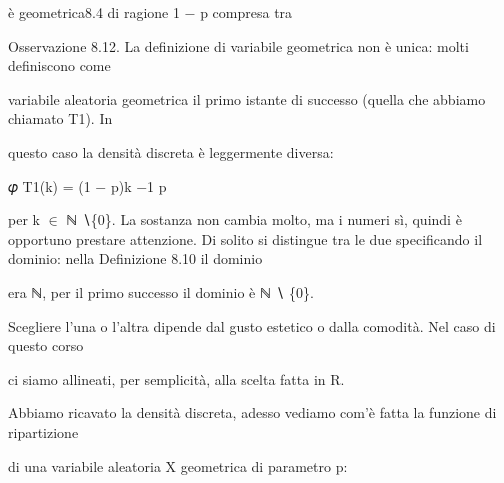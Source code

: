 \documentclass[a4paper,portrait,12pt]{article}
\begin{document}
\begin{flushleft}
\`{e} geometrica8.4 di ragione 1 $-$ p compresa tra
\end{flushleft}





\begin{flushleft}
Osservazione 8.12. La definizione di variabile geometrica non \`{e} unica: molti definiscono come
\end{flushleft}


\begin{flushleft}
variabile aleatoria geometrica il primo istante di successo (quella che abbiamo chiamato T1). In
\end{flushleft}


\begin{flushleft}
questo caso la densit\`{a} discreta \`{e} leggermente diversa:
\end{flushleft}


\begin{flushleft}
𝜑 T1(k) = (1 $-$ p)k $-$1 p
\end{flushleft}


\begin{flushleft}
per k $\in$ ℕ ∖\{0\}. La sostanza non cambia molto, ma i numeri sì, quindi \`{e} opportuno prestare attenzione. Di solito si distingue tra le due specificando il dominio: nella Definizione 8.10 il dominio
\end{flushleft}


\begin{flushleft}
era ℕ, per il primo successo il dominio \`{e} ℕ ∖ \{0\}.
\end{flushleft}


\begin{flushleft}
Scegliere l'una o l'altra dipende dal gusto estetico o dalla comodit\`{a}. Nel caso di questo corso
\end{flushleft}


\begin{flushleft}
ci siamo allineati, per semplicit\`{a}, alla scelta fatta in R.
\end{flushleft}


\begin{flushleft}
Abbiamo ricavato la densit\`{a} discreta, adesso vediamo com'\`{e} fatta la funzione di ripartizione
\end{flushleft}


\begin{flushleft}
di una variabile aleatoria X geometrica di parametro p:
\end{flushleft}
\end{document}
